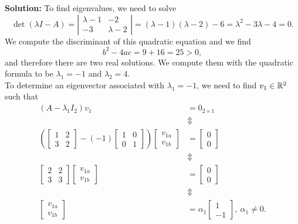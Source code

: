 \documentclass[letterpaper]{book}
\begin{document}
\vspace*{.2cm}

\textbf{Solution:} To find eigenvalues, we need to solve 
$$\det(\lambda I-A)= \left| \begin{array}{cc}
    \lambda-1 & -2\\
   -3 &\lambda -2
    \end{array} \right| =(\lambda-1)(\lambda-2)-6=\lambda^2- 3 \lambda -4=0.$$
    We compute the discriminant of this quadratic equation and we find
    $$b^2-4ac = 9 +16 =25 >0,$$
    and therefore there are two real solutions. We compute them with the quadratic formula to be $\lambda_1=-1$ and $\lambda_2=4$.\\
    
   To determine an eigenvector associated with $ \lambda_1=-1$, we need to find $v_1\in \mathbb R^2$ such that 
   \begin{align*}
       (A-\lambda_1 I_2) v_1 & = 0_{2 \times 1}\\
        & \Updownarrow \\
   \left( \left[\begin{array}{rr}
    1 & 2\\
    3 & 2
    \end{array}\right] - (-1)   \left[\begin{array}{rr}
    1 & 0\\
    0& 1
    \end{array}\right]\right) \left[\begin{array}{r}
   v_{1a} \\
  v_{1b}
    \end{array}\right] & = \left[\begin{array}{r}
   0 \\
  0
    \end{array}\right]\\
     & \Updownarrow \\
      \left[\begin{array}{rr}
    2 & 2\\
    3 & 3
    \end{array}\right]  \left[\begin{array}{r}
   v_{1a} \\
  v_{1b}
    \end{array}\right] & = \left[\begin{array}{r}
   0 \\
  0
    \end{array}\right]\\
    & \Updownarrow \\
   \left[\begin{array}{r}
   v_{1a} \\
  v_{1b}
    \end{array}\right] & = \alpha_1  \left[\begin{array}{r}
   1 \\
  -1
    \end{array}\right], ~\alpha_1 \neq 0.
   \end{align*}
  
\end{document}
